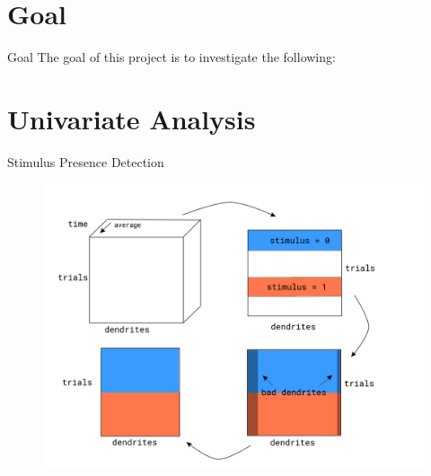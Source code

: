 \documentclass[10pt]{beamer}
\begin{document}
\section{Goal}
\begin{frame}[fragile]{Goal}
The goal of this project is to investigate the following:
\begin{itemize}
\end{itemize}
\end{frame}

\section{Univariate Analysis}

\begin{frame}[fragile]{Stimulus Presence Detection}
\begin{center}
	\begin{figure}
      \includegraphics[width=1.0\textwidth]{data_p.png}
	\end{figure}
	\end{center}
\end{frame}
\end{document}
